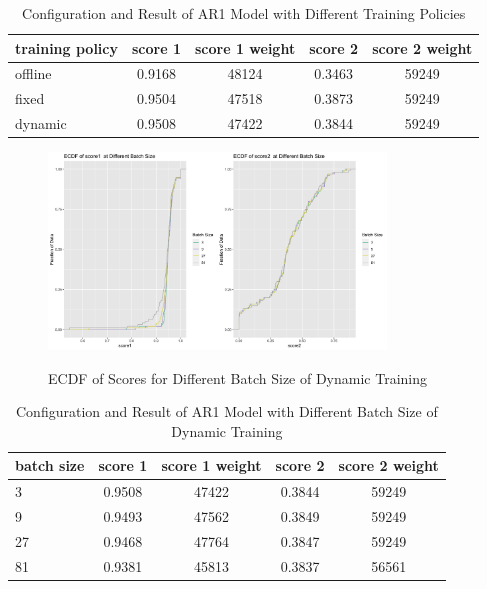 \documentclass{article}
\begin{document}
\begin{table}[htbp]
  \begin{center}
    \caption{Configuration and Result of AR1 Model with Different Training Policies}
    \label{tab:tab1.5.1}
    \begin{tabular}{l|*{4}{c}}
      \textbf{training policy} & \textbf{score 1} & \textbf{score 1 weight} & \textbf{score 2} & \textbf{score 2 weight} \\
      \hline
      offline & 0.9168 & 48124 & 0.3463 & 59249\\
      fixed & 0.9504 & 47518 & 0.3873 & 59249\\
      dynamic & 0.9508 & 47422 & 0.3844 & 59249\\
    \end{tabular}
  \end{center}
\end{table}

\begin{figure}
    \caption{ECDF of Scores for Different Batch Size of Dynamic Training}
    \centering
    \includegraphics[width = 0.8\textwidth]{images/ECDFofscoresatDifferentBatchSizeOfAR1,840,1.png}
    \label{fig:fig1.5.2}
\end{figure}

\begin{table}[htbp]
  \begin{center}
    \caption{Configuration and Result of AR1 Model with Different Batch Size of Dynamic Training}
    \label{tab:tab1.5.2}
    \begin{tabular}{l|*{4}{c}}
      \textbf{batch size} & \textbf{score 1} & \textbf{score 1 weight} & \textbf{score 2} & \textbf{score 2 weight} \\
      \hline
      3 & 0.9508 & 47422 & 0.3844 & 59249\\
      9 & 0.9493 & 47562 & 0.3849 & 59249\\
      27 & 0.9468 & 47764 & 0.3847 & 59249\\
      81 & 0.9381 & 45813 & 0.3837 & 56561\\
    \end{tabular}
  \end{center}
\end{table}
\end{document}
